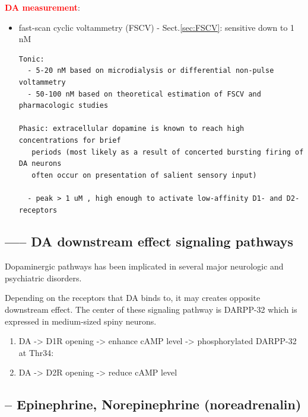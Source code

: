 \textcolor{red}{\bf DA measurement}:
\begin{itemize}
  \item fast-scan cyclic voltammetry (FSCV) - Sect.\ref{sec:FSCV}:
  sensitive down to 1 nM 
\begin{verbatim}
Tonic:
  - 5-20 nM based on microdialysis or differential non-pulse voltammetry
  - 50-100 nM based on theoretical estimation of FSCV and pharmacologic studies

Phasic: extracellular dopamine is known to reach high concentrations for brief
   periods (most likely as a result of concerted bursting firing of DA neurons
   often occur on presentation of salient sensory input)   

  - peak > 1 uM , high enough to activate low-affinity D1- and D2-receptors

\end{verbatim}
  
  
\end{itemize}





\subsection{----- DA downstream effect signaling pathways}
\label{sec:dopamine-signaling-pathway}

Dopaminergic pathways has been implicated in several major neurologic and
psychiatric disorders.

Depending on the receptors that DA binds to, it may creates opposite downstream
effect. The center of these signaling pathway is DARPP-32 which is expressed in
medium-sized spiny neurons.

\begin{enumerate}
  \item DA -> D1R opening -> enhance cAMP level -> phosphorylated DARPP-32 at
  Thr34:
  
  \item DA -> D2R opening -> reduce cAMP level
\end{enumerate}




\subsection{-- Epinephrine, Norepinephrine (noreadrenalin)}
\label{sec:norepinephrine}
\label{sec:epinephrine}
\label{sec:noradrenalin}

